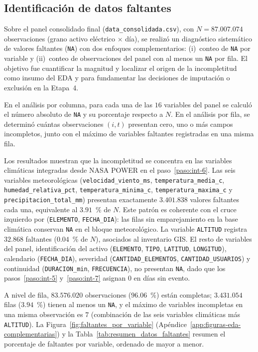 \subsection{Identificación de datos faltantes}
\label{sec:identificacion_datos_faltantes}
    Sobre el panel consolidado final (\texttt{data\_consolidada.csv}), con $N = 87{.}007{.}074$ observaciones (grano activo eléctrico $\times$ día), se realizó un diagnóstico sistemático de valores faltantes (\texttt{NA}) con dos enfoques complementarios: (i)~conteo de \texttt{NA} por variable y (ii)~conteo de observaciones del panel con al menos un \texttt{NA} por fila. El objetivo fue cuantificar la magnitud y localizar el origen de la incompletitud como insumo del EDA y para fundamentar las decisiones de imputación o exclusión en la Etapa~4.
    
    En el análisis por columna, para cada una de las $16$ variables del panel se calculó el número absoluto de \texttt{NA} y su porcentaje respecto a $N$. En el análisis por fila, se determinó cuántas observaciones $(i,t)$ presentan cero, uno o más campos incompletos, junto con el máximo de variables faltantes registradas en una misma fila.
    
    Los resultados muestran que la incompletitud se concentra en las variables climáticas integradas desde NASA POWER en el paso~\ref{paso:int-6}. Las seis variables meteorológicas (\texttt{velocidad\_viento\_ms}, \texttt{temperatura\_media\_c}, \texttt{humedad\_relativa\_pct}, \texttt{temperatura\_minima\_c}, \texttt{temperatura\_maxima\_c} y \texttt{precipitacion\_total\_mm}) presentan exactamente $3{.}401{.}838$ valores faltantes cada una, equivalente al $3{.}91$~\% de $N$. Este patrón es coherente con el cruce izquierdo por (\texttt{ELEMENTO}, \texttt{FECHA\_DIA}): las filas sin emparejamiento en la base climática conservan \texttt{NA} en el bloque meteorológico. La variable \texttt{ALTITUD} registra $32{.}868$ faltantes ($0{.}04$~\% de $N$), asociados al inventario GIS. El resto de variables del panel, identificación del activo (\texttt{ELEMENTO}, \texttt{TIPO}, \texttt{LATITUD}, \texttt{LONGITUD}), calendario (\texttt{FECHA\_DIA}), severidad (\texttt{CANTIDAD\_ELEMENTOS}, \texttt{CANTIDAD\_USUARIOS}) y continuidad (\texttt{DURACION\_min}, \texttt{FRECUENCIA}), no presentan \texttt{NA}, dado que los pasos~\ref{paso:int-5} y~\ref{paso:int-7} asignan $0$ en días sin evento.
    
    A nivel de fila, $83{.}576{.}020$ observaciones ($96{.}06$~\%) están completas; $3{.}431{.}054$ filas ($3{.}94$~\%) tienen al menos un \texttt{NA}, y el máximo de variables incompletas en una misma observación es $7$ (combinación de las seis variables climáticas más \texttt{ALTITUD}). La Figura~\ref{fig:faltantes_por_variable} (Apéndice~\ref{app:figuras-eda-complementarias}) y la Tabla~\ref{tab:resumen_datos_faltantes} resumen el porcentaje de faltantes por variable, ordenado de mayor a menor.
    
